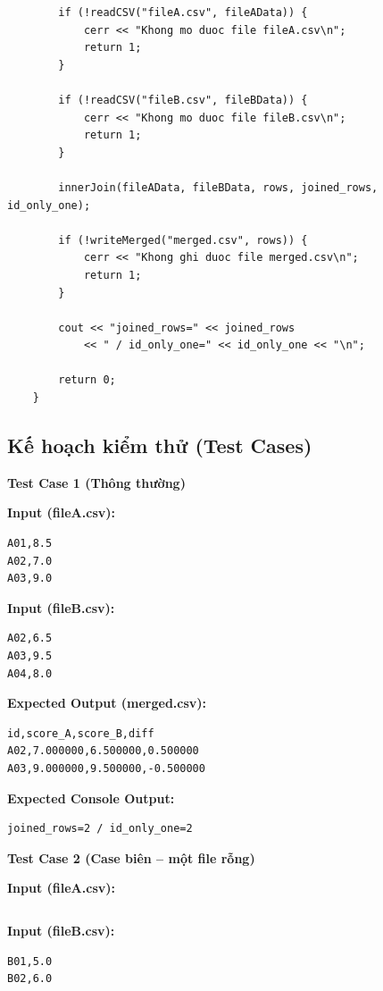 \begin{lstlisting}
        if (!readCSV("fileA.csv", fileAData)) {
            cerr << "Khong mo duoc file fileA.csv\n";
            return 1;
        }

        if (!readCSV("fileB.csv", fileBData)) {
            cerr << "Khong mo duoc file fileB.csv\n";
            return 1;
        }

        innerJoin(fileAData, fileBData, rows, joined_rows, id_only_one);

        if (!writeMerged("merged.csv", rows)) {
            cerr << "Khong ghi duoc file merged.csv\n";
            return 1;
        }

        cout << "joined_rows=" << joined_rows
            << " / id_only_one=" << id_only_one << "\n";

        return 0;
    }
\end{lstlisting}

\subsection{Kế hoạch kiểm thử (Test Cases)}

\textbf{Test Case 1 (Thông thường)}

\textbf{Input (fileA.csv):}
\begin{lstlisting}
A01,8.5
A02,7.0
A03,9.0
\end{lstlisting}

\textbf{Input (fileB.csv):}
\begin{lstlisting}
A02,6.5
A03,9.5
A04,8.0
\end{lstlisting}

\textbf{Expected Output (merged.csv):}
\begin{lstlisting}
id,score_A,score_B,diff
A02,7.000000,6.500000,0.500000
A03,9.000000,9.500000,-0.500000
\end{lstlisting}

\textbf{Expected Console Output:}
\begin{lstlisting}
joined_rows=2 / id_only_one=2
\end{lstlisting}

\vspace{0.5cm}

\textbf{Test Case 2 (Case biên -- một file rỗng)}

\textbf{Input (fileA.csv):}
\begin{lstlisting}
\end{lstlisting}

\textbf{Input (fileB.csv):}
\begin{lstlisting}
B01,5.0
B02,6.0
\end{lstlisting}

